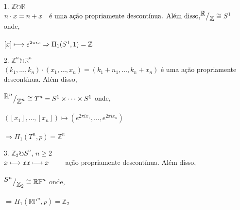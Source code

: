 \begin{ex}
\ 
	\begin{itemize}
    
        \item[1.] $\mathbb{Z}\circlearrowright\mathbb{R}$\\
            $n\cdot x = n+x \text{\ \ \  é uma ação propriamente descontínua. Além disso,} \\\\
            \mkern-18mu \quad{^{\textstyle \mathbb{R}}\big/_{\textstyle \mathbb{Z}}} \cong S^1$ onde,\\\\
            $[x]\longmapsto e^{2\pi ix}\\\\
            \Rightarrow \Pi_1(S^1 , 1) = \mathbb{Z}$\\
            
	    \item[2.] $\mathbb{Z}^n\circlearrowright\mathbb{R}^n$\\
            $(k_1,\dots, k_n)\cdot(x_1,\dots,x_n) = (k_1+n_1,\dots,k_n+x_n)$ é uma ação propriamente descontínua. Além disso,\\\\
            $\mkern-18mu \quad{^{\textstyle \mathbb{R}^n}\big/_{\textstyle \mathbb{Z}^n}} \cong T^n = S^1\times\dots\times S^1$ onde,\\\\
            $([x_1],\dots,[x_n])\longmapsto (e^{2\pi ix_1},\dots,e^{2\pi ix_n})$\\\\
            $\Rightarrow \Pi_1(T^n , p) = \mathbb{Z}^n$\\

        \item[3.] $\mathbb{Z}_2\circlearrowright S^n$, $n\geq2$\\
            $x\longmapsto x\\
             x\longmapsto x$ \ \ \ \ ação propriamente descontínua. Além disso,\\\\
            $\mkern-18mu \quad{^{\textstyle S^n}\big/_{\textstyle \mathbb{Z}_2}} \cong \mathbb{RP}^n$ onde,\\\\
            $\Rightarrow \Pi_1(\mathbb{RP}^n , p) = \mathbb{Z}_2$\\


\end{itemize}
\end{ex}
